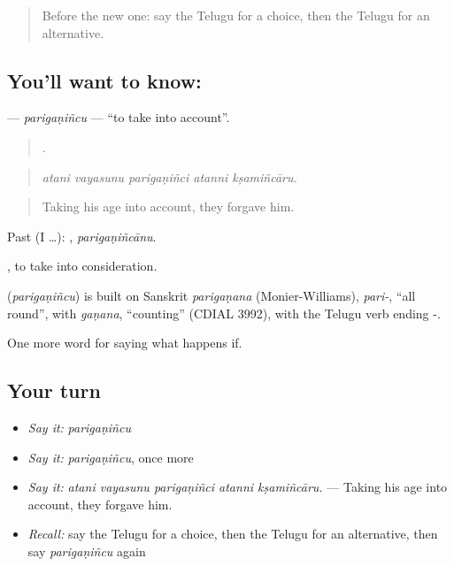 \label{lesson:TE-C420-pariganincu}



\begin{quote}
Before the new one: say the Telugu for a choice, then the Telugu for an alternative.
\end{quote}

\subsection*{You'll want to know: }
\textbf{} — \emph{parigaṇiñcu} — \textquotedblleft{}to take into account\textquotedblright{}.

\begin{quote}
    .
\end{quote}

\begin{quote}
\emph{atani vayasunu parigaṇiñci atanni kṣamiñcāru.}
\end{quote}

\begin{quote}
Taking his age into account, they forgave him.
\end{quote}

Past (I …): , \emph{parigaṇiñcānu}.

 , to take into consideration.

\begin{cousinweb}
\textbf{} (\emph{parigaṇiñcu}) is built on Sanskrit \emph{parigaṇana} (Monier-Williams), \emph{pari-}, \textquotedblleft{}all round\textquotedblright{}, with \emph{gaṇana}, \textquotedblleft{}counting\textquotedblright{} (CDIAL 3992), with the Telugu verb ending -.
\end{cousinweb}

\begin{grammarlens}[title={What you've built}]
One more word for saying what happens if.
\end{grammarlens}

\subsection*{Your turn}
\begin{itemize}
\raggedright
  \item \emph{Say it:} \emph{parigaṇiñcu}
  \item \emph{Say it:} \emph{parigaṇiñcu}, once more
  \item \emph{Say it:} \emph{atani vayasunu parigaṇiñci atanni kṣamiñcāru.} — Taking his age into account, they forgave him.
  \item \emph{Recall:} say the Telugu for a choice, then the Telugu for an alternative, then say \emph{parigaṇiñcu} again
\end{itemize}

